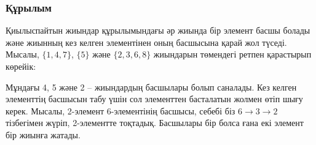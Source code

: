\subsubsection{Құрылым}
Қиылыспайтын жиындар құрылымындағы әр жиында бір элемент
басшы болады және жиынның кез келген элементінен оның басшысына қарай жол түседі. 
Мысалы, $\{1,4,7\}$, $\{5\}$ және $\{2,3,6,8\}$ жиындарын 
төмендегі ретпен қарастырып көрейік:
\begin{center}
\end{center}
Мұндағы  4, 5 және 2 -- жиындардың басшылары болып саналады.
Кез келген элементтің басшысын табу үшін сол элементтен басталатын жолмен өтіп шығу керек. 
Мысалы, 2-элемент 6-элементінің басшысы, себебі біз
$6 \rightarrow 3 \rightarrow 2$ тізбегімен жүріп, 2-элементте
тоқтадық.
Басшылары бір болса ғана екі элемент бір жиынға жатады.

